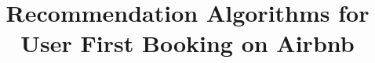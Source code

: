 \documentclass{sig-alternate-05-2015}
\begin{document}


%

\title{Recommendation Algorithms for User First Booking on Airbnb}

%
%
%
%
%
\end{document}
